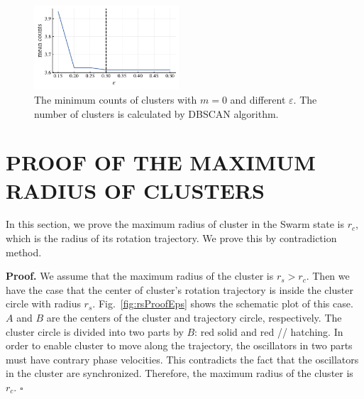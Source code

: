 \documentclass[%
 aip,
 amsmath,amssymb,
 reprint,%
]{revtex4-1}
\newenvironment{proof}{\noindent\textbf{Proof.}}{\hfill $\square$\par}
\begin{document}
\begin{figure}
    \includegraphics[width=0.48\textwidth]{./figs/DBSCANparam.pdf}
    \caption{
        \label{fig:DBSCANparam} The minimum counts of clusters with $m=0$ and different $\varepsilon$. The number of clusters is calculated by DBSCAN algorithm. 
    }
\end{figure}



\section{\label{sec:maxRadius} PROOF OF THE MAXIMUM RADIUS OF CLUSTERS}

In this section, we prove the maximum radius of cluster in the Swarm state is $r_c$, which is the radius of its rotation trajectory. We prove this by contradiction method.

\begin{proof}
    We assume that the maximum radius of the cluster is $r_s>r_c$. Then we have the case that the center of cluster's rotation trajectory is inside the cluster circle with radius $r_s$. 
    Fig.~\ref{fig:rsProofEps} shows the schematic plot of this case. $A$ and $B$ 
    are the centers of the cluster and trajectory circle, respectively. The cluster circle is divided into two parts by $B$: red solid and red // hatching. In order to enable cluster to move along the trajectory, the oscillators in two parts must have contrary phase velocities. This contradicts the fact that the oscillators in the cluster are synchronized. Therefore, the maximum radius of the cluster is $r_c$.
\end{proof}
\end{document}
